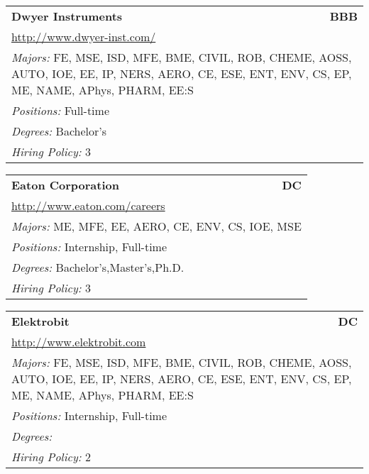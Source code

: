 \documentclass[twoside]{article}
\begin{document}
\begin{center}
\begin{multicols}{3}
\begin{FlushLeft}
\begin{minipage}{\columnwidth}\begin{tabularx}{.95\columnwidth}{Xr}
                 {\Large\bf Dwyer Instruments} & {\Large\bf BBB}\\
    \multicolumn{2}{p{.95\columnwidth}}{\url{http://www.dwyer-inst.com/}}\\
    \multicolumn{2}{p{.95\columnwidth}}{\emph{Majors:} FE, MSE, ISD, MFE, BME, CIVIL, ROB, CHEME, AOSS, AUTO, IOE, EE, IP, NERS, AERO, CE, ESE, ENT, ENV, CS, EP, ME, NAME, APhys, PHARM, EE:S}\\
    \multicolumn{2}{p{.95\columnwidth}}{\emph{Positions:} Full-time}\\
    \multicolumn{2}{p{.95\columnwidth}}{\emph{Degrees:} Bachelor's}\\
    \multicolumn{2}{p{.95\columnwidth}}{\emph{Hiring Policy:} 3}\\
    \end{tabularx}
    
\end{minipage}
 
\begin{minipage}{\columnwidth}\begin{tabularx}{.95\columnwidth}{Xr}
                 {\Large\bf Eaton Corporation} & {\Large\bf DC}\\
    \multicolumn{2}{p{.95\columnwidth}}{\url{http://www.eaton.com/careers}}\\
    \multicolumn{2}{p{.95\columnwidth}}{\emph{Majors:} ME, MFE, EE, AERO, CE, ENV, CS, IOE, MSE}\\
    \multicolumn{2}{p{.95\columnwidth}}{\emph{Positions:} Internship, Full-time}\\
    \multicolumn{2}{p{.95\columnwidth}}{\emph{Degrees:} Bachelor's,Master's,Ph.D.}\\
    \multicolumn{2}{p{.95\columnwidth}}{\emph{Hiring Policy:} 3}\\
    \end{tabularx}
    
\end{minipage}
 
\begin{minipage}{\columnwidth}\begin{tabularx}{.95\columnwidth}{Xr}
                 {\Large\bf Elektrobit} & {\Large\bf DC}\\
    \multicolumn{2}{p{.95\columnwidth}}{\url{http://www.elektrobit.com}}\\
    \multicolumn{2}{p{.95\columnwidth}}{\emph{Majors:} FE, MSE, ISD, MFE, BME, CIVIL, ROB, CHEME, AOSS, AUTO, IOE, EE, IP, NERS, AERO, CE, ESE, ENT, ENV, CS, EP, ME, NAME, APhys, PHARM, EE:S}\\
    \multicolumn{2}{p{.95\columnwidth}}{\emph{Positions:} Internship, Full-time}\\
    \multicolumn{2}{p{.95\columnwidth}}{\emph{Degrees:} }\\
    \multicolumn{2}{p{.95\columnwidth}}{\emph{Hiring Policy:} 2}\\
    \end{tabularx}
    

\end{minipage}
\end{FlushLeft}
\end{multicols}
\end{center}
\end{document}
